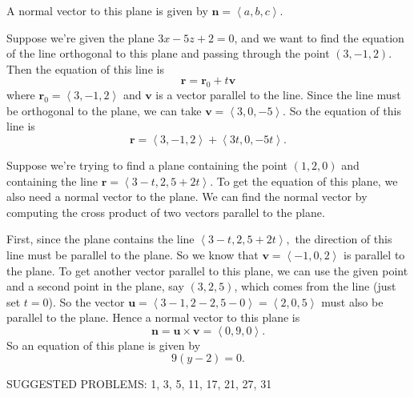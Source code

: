 \documentclass[10pt,]{book}
\theoremstyle{ptxplainnotitle}
\theoremstyle{ptxplaintitle}
\theoremstyle{ptxplainnotitle}
\theoremstyle{ptxplaintitle}
\theoremstyle{ptxplainnotitle}
\theoremstyle{ptxplaintitle}
\theoremstyle{ptxdefinitionnotitle}
\theoremstyle{ptxdefinitiontitle}
\theoremstyle{ptxdefinitionnotitle}
\theoremstyle{ptxdefinitiontitle}
\theoremstyle{ptxdefinitionnotitle}
\theoremstyle{ptxdefinitiontitle}
\theoremstyle{ptxdefinitionnotitle}
\theoremstyle{ptxdefinitiontitle}
\theoremstyle{ptxdefinitionnotitle}
\theoremstyle{ptxdefinitiontitle}
\numberwithin{equation}{section}
\newcommand{\vv}[1]{\mathbf{#1}}
\newcommand{\dotprod}[1]{\left\langle #1 \right\rangle}
\begin{document}
\hypertarget{p-884}{}%
A normal vector to this plane is given by \(\vv{n} = \dotprod{a,b,c}\).%
\begin{example}\label{example-equation-of-a-line-orthogonal-to-a-plane}
\hypertarget{p-885}{}%
Suppose we're given the plane \(3x-5z+2 = 0\), and we want to find the equation of the line orthogonal to this plane and passing through the point \((3,-1,2)\). Then the equation of this line is%
%
\begin{equation*}
\vv{r} = \vv{r}_{0}+t\vv{v}
\end{equation*}
\hypertarget{p-886}{}%
where \(\vv{r}_{0} = \dotprod{3,-1,2}\) and \(\vv{v}\) is a vector parallel to the line. Since the line must be orthogonal to the plane, we can take \(\vv{v} = \dotprod{3,0,-5}\). So the equation of this line is%
%
\begin{equation*}
\vv{r} = \dotprod{3,-1,2}+\dotprod{3t,0,-5t}.
\end{equation*}
\end{example}
\begin{example}\label{example-equation-of-a-line-of-intersection-between-two-planes}
\hypertarget{p-887}{}%
Suppose we're trying to find a plane containing the point \((1,2,0)\) and containing the line \(\vv{r} = \dotprod{3-t,2,5+2t}\). To get the equation of this plane, we also need a normal vector to the plane. We can find the normal vector by computing the cross product of two vectors parallel to the plane.%
\par
\hypertarget{p-888}{}%
First, since the plane contains the line \(\dotprod{3-t,2,5+2t},\) the direction of this line must be parallel to the plane. So we know that \(\vv{v} = \dotprod{-1,0,2}\) is parallel to the plane. To get another vector parallel to this plane, we can use the given point and a second point in the plane, say \((3,2,5)\), which comes from the line (just set \(t=0\)). So the vector \(\vv{u} = \dotprod{3-1,2-2,5-0} = \dotprod{2,0,5}\) must also be parallel to the plane. Hence a normal vector to this plane is%
%
\begin{equation*}
\vv{n} = \vv{u}\times\vv{v} = \dotprod{0,9,0}.
\end{equation*}
\hypertarget{p-889}{}%
So an equation of this plane is given by%
%
\begin{equation*}
9(y-2) = 0.
\end{equation*}
\end{example}
\hypertarget{p-890}{}%
SUGGESTED PROBLEMS: 1, 3, 5, 11, 17, 21, 27, 31%
\typeout{************************************************}
\typeout{************************************************}
\end{document}
